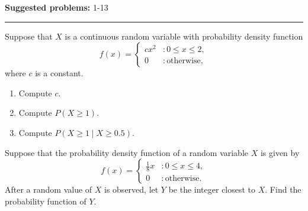 \documentclass[12pt,reqno]{amsart}
\begin{document}
\textbf{Suggested problems:} 1-13

\bigskip
\hrule

\bigskip
\prob Suppose that $X$ is a continuous random variable with probability density function
	\[
	f(x) = \begin{cases}
	cx^2 & : 0 \leq x \leq 2, \\
	0 & : \text{otherwise},
	\end{cases}
	\]
where $c$ is a constant.

\begin{enumerate}
\item Compute $c$.\vfill
\item Compute $P( X \geq 1)$.\vfill
\item Compute $P( X \geq 1 \mid X \geq 0.5)$.
\end{enumerate}

\vfill
\prob Suppose that the probability density function of a random variable $X$ is given by
	\[
	f(x) = \begin{cases}
	\frac{1}{8}x & : 0 \leq x \leq 4, \\
	0 & : \text{otherwise}.
	\end{cases}
	\]
After a random value of $X$ is observed, let $Y$ be the integer closest to $X$. Find the probability function of $Y$.

\vfill
\end{document}
